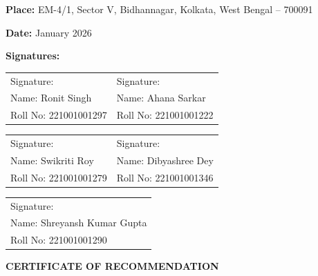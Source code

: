 \documentclass[12pt,a4paper,oneside]{report}
\begin{document}
\vspace{1cm}

\textbf{Place:} EM-4/1, Sector V, Bidhannagar, Kolkata, West Bengal -- 700091

\vspace{0.5cm}

\textbf{Date:} January 2026

\vspace{1cm}

\textbf{Signatures:}

\vspace{1cm}

\begin{tabular}{p{7cm}p{7cm}}
Signature: & Signature: \\
Name: Ronit Singh & Name: Ahana Sarkar \\
Roll No: 221001001297 & Roll No: 221001001222
\end{tabular}

\vspace{1cm}

\begin{tabular}{p{7cm}p{7cm}}
Signature: & Signature: \\
Name: Swikriti Roy & Name: Dibyashree Dey \\
Roll No: 221001001279 & Roll No: 221001001346
\end{tabular}

\vspace{1cm}

\begin{tabular}{p{7cm}}
Signature: \\
Name: Shreyansh Kumar Gupta \\
Roll No: 221001001290
\end{tabular}


\newpage
\thispagestyle{empty}
\mbox{}


\newpage

\begin{center}
{\Large \textbf{CERTIFICATE OF RECOMMENDATION}}
\end{center}

\vspace{1cm}
\end{document}
